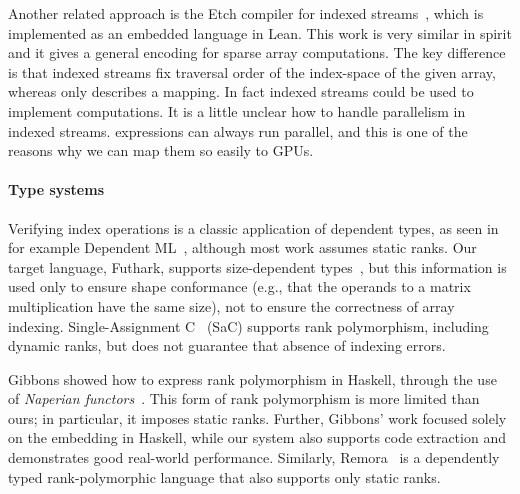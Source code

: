 Another related approach is the Etch compiler for indexed
streams~\cite{10.1145/3591268}, which is implemented as an embedded
language in Lean.  This work is very similar in spirit and it gives
a general encoding for sparse array computations.  The key difference
is that indexed streams fix traversal order of the index-space
of the given array, whereas  only describes a mapping.
In fact indexed streams could be used to implement 
computations.  It is a little unclear how to handle parallelism
in indexed streams.   expressions can always run parallel,
and this is one of the reasons why we can map them so easily to GPUs.


\paragraph{Type systems}

Verifying index operations is a classic application of dependent
types, as seen in for example Dependent
ML~\cite{10.1145/292540.292560}, although most work assumes static
ranks. Our target language, Futhark, supports size-dependent
types~\cite{10.1145/3609024.3609412}, but this information is used
only to ensure shape conformance (e.g., that the operands to a matrix
multiplication have the same size), not to ensure the correctness of
array indexing. Single-Assignment C~\cite{sac2} (SaC) supports rank
polymorphism, including dynamic ranks, but does not guarantee that
absence of indexing errors.

Gibbons showed how to express rank polymorphism in Haskell, through
the use of \emph{Naperian functors}~\cite{10.1145/2976022.2976023}.
This form of rank polymorphism is more limited than ours; in
particular, it imposes static ranks. Further, Gibbons' work focused
solely on the embedding in Haskell, while our system also supports
code extraction and demonstrates good real-world performance.
Similarly, Remora~\cite{rank-poly} is a dependently typed
rank-polymorphic language that also supports only static ranks.
